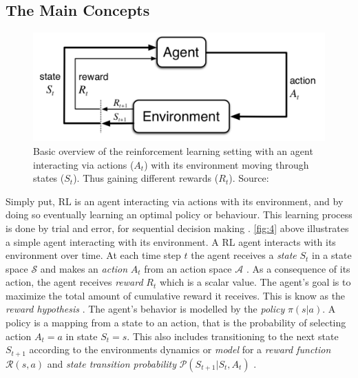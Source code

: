 \documentclass{kththesis}
\theoremstyle{definition}
\begin{document}
\subsection{The Main Concepts}
\begin{figure}[H]
    \centering
    \includegraphics[scale=1]{basicRL.png}
    \caption{Basic overview of the reinforcement learning setting with an agent interacting via actions ($A_t$) with its environment moving through states ($S_t$). Thus gaining different rewards ($R_t$). Source: \textcite{sutton1998reinforcement} }
    \label{fig:4}
\end{figure}

Simply put, RL is an agent interacting via actions with its environment, and by doing so eventually learning an optimal policy or behaviour. This learning process is done by trial and error, for sequential decision making \parencite{li2017deep}. \autoref{fig:4} above illustrates a simple agent interacting with its environment. A RL agent interacts with its environment over time. At each time step $t$ the agent receives  a \textit{state} $S_t$ in a state space $\mathcal{S}$ and makes an \textit{action} $A_t$ from an action space $\mathcal{A}$ \parencite{li2017deep}. As a consequence of its action, the agent receives \textit{reward} $R_t$ which is a scalar value. 
\newline
\newline
The agent's goal is to maximize the total amount of cumulative reward it receives. This is know as the \textit{reward hypothesis} \parencite{sutton1998reinforcement}. The agent's behavior is modelled by the \textit{policy} $\pi(s|a)$. A policy is a mapping from a state to an action, that is the probability of selecting action $A_t=a$ in state $S_t = s$. This also includes transitioning to the next state $S_{t+1}$ according to the environments dynamics or \textit{model} for a \textit{reward function} $\mathcal{R}(s,a)$ and \textit{state transition probability} $\mathcal{P}(S_{t+1} |S_t, A_t)$ \parencite{li2017deep}.
\newline
\end{document}
